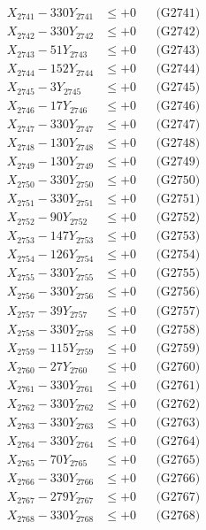\documentclass[a4paper,10pt]{article}
\begin{document}
{\begin{align}
\allowbreak
X_{2741} - 330Y_{2741} &\leq +0 && \text{(G2741)} \\
X_{2742} - 330Y_{2742} &\leq +0 && \text{(G2742)} \\
X_{2743} - 51Y_{2743} &\leq +0 && \text{(G2743)} \\
X_{2744} - 152Y_{2744} &\leq +0 && \text{(G2744)} \\
X_{2745} - 3Y_{2745} &\leq +0 && \text{(G2745)} \\
X_{2746} - 17Y_{2746} &\leq +0 && \text{(G2746)} \\
X_{2747} - 330Y_{2747} &\leq +0 && \text{(G2747)} \\
X_{2748} - 130Y_{2748} &\leq +0 && \text{(G2748)} \\
X_{2749} - 130Y_{2749} &\leq +0 && \text{(G2749)} \\
X_{2750} - 330Y_{2750} &\leq +0 && \text{(G2750)} \\
\allowbreak
X_{2751} - 330Y_{2751} &\leq +0 && \text{(G2751)} \\
X_{2752} - 90Y_{2752} &\leq +0 && \text{(G2752)} \\
X_{2753} - 147Y_{2753} &\leq +0 && \text{(G2753)} \\
X_{2754} - 126Y_{2754} &\leq +0 && \text{(G2754)} \\
X_{2755} - 330Y_{2755} &\leq +0 && \text{(G2755)} \\
X_{2756} - 330Y_{2756} &\leq +0 && \text{(G2756)} \\
X_{2757} - 39Y_{2757} &\leq +0 && \text{(G2757)} \\
X_{2758} - 330Y_{2758} &\leq +0 && \text{(G2758)} \\
X_{2759} - 115Y_{2759} &\leq +0 && \text{(G2759)} \\
X_{2760} - 27Y_{2760} &\leq +0 && \text{(G2760)} \\
\allowbreak
X_{2761} - 330Y_{2761} &\leq +0 && \text{(G2761)} \\
X_{2762} - 330Y_{2762} &\leq +0 && \text{(G2762)} \\
X_{2763} - 330Y_{2763} &\leq +0 && \text{(G2763)} \\
X_{2764} - 330Y_{2764} &\leq +0 && \text{(G2764)} \\
X_{2765} - 70Y_{2765} &\leq +0 && \text{(G2765)} \\
X_{2766} - 330Y_{2766} &\leq +0 && \text{(G2766)} \\
X_{2767} - 279Y_{2767} &\leq +0 && \text{(G2767)} \\
X_{2768} - 330Y_{2768} &\leq +0 && \text{(G2768)} \\

\end{align}}
\end{document}

